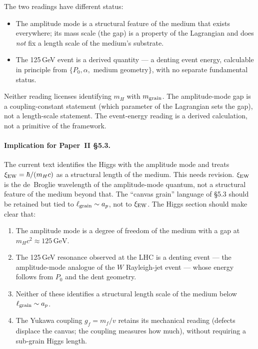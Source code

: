 \documentclass[11pt,a4paper]{article}
\begin{document}
The two readings have different status:
\begin{itemize}
\item The amplitude mode is a structural feature of the medium that
      exists everywhere; its mass scale (the gap) is a property of the
      Lagrangian and does \emph{not} fix a length scale of the
      medium's substrate.
\item The 125\,GeV event is a derived quantity --- a denting event
      energy, calculable in principle from $\{P_0, \alpha,$ medium
      geometry$\}$, with no separate fundamental status.
\end{itemize}

Neither reading licenses identifying $m_H$ with $m_{\rm grain}$.  The
amplitude-mode gap is a coupling-constant statement (which parameter of
the Lagrangian sets the gap), not a length-scale statement.  The
event-energy reading is a derived calculation, not a primitive of the
framework.

\paragraph{Implication for Paper~II \S5.3.}
The current text identifies the Higgs with the amplitude mode and
treats $\xi_{\rm EW} = \hbar/(m_H c)$ as a structural length of the
medium.  This needs revision.  $\xi_{\rm EW}$ is the de~Broglie
wavelength of the amplitude-mode quantum, not a structural feature of
the medium beyond that.  The ``canvas grain'' language of \S5.3 should
be retained but tied to $\ell_{\rm grain} \sim a_p$, not to
$\xi_{\rm EW}$.  The Higgs section should make clear that:
\begin{enumerate}
\item The amplitude mode is a degree of freedom of the medium with a
      gap at $m_H c^2 \approx 125\,\mathrm{GeV}$.
\item The 125\,GeV resonance observed at the LHC is a denting event ---
      the amplitude-mode analogue of the $W$ Rayleigh-jet event ---
      whose energy follows from $P_0$ and the dent geometry.
\item Neither of these identifies a structural length scale of the
      medium below $\ell_{\rm grain} \sim a_p$.
\item The Yukawa coupling $g_f = m_f/v$ retains its mechanical
      reading (defects displace the canvas; the coupling measures how
      much), without requiring a sub-grain Higgs length.
\end{enumerate}
\end{document}
